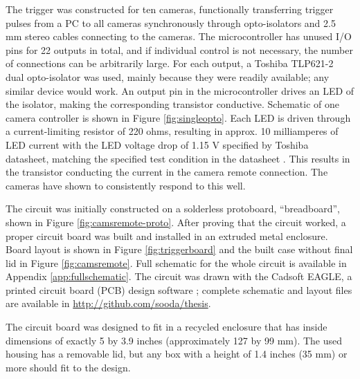 The trigger was constructed for ten cameras, functionally transferring trigger pulses from a PC to all cameras synchronously through opto-isolators and 2.5 mm stereo cables connecting to the cameras.
The microcontroller has unused I/O pins for 22 outputs in total, and if individual control is not necessary, the number of connections can be arbitrarily large.
For each output, a Toshiba TLP621-2 dual opto-isolator was used, mainly because they were readily available; any similar device would work.
An output pin in the microcontroller drives an LED of the isolator, making the corresponding transistor conductive.
Schematic of one camera controller is shown in Figure \ref{fig:singleopto}.
Each LED is driven through a current-limiting resistor of 220 ohms, resulting in approx. 10 milliamperes of LED current with the LED voltage drop of 1.15 V specified by Toshiba datasheet, matching the specified test condition in the datasheet \cite{tlp621}.
This results in the transistor conducting the current in the camera remote connection.
The cameras have shown to consistently respond to this well.

The circuit was initially constructed on a solderless protoboard, ``breadboard'', shown in Figure \ref{fig:camsremote-proto}.
After proving that the circuit worked, a proper circuit board was built and installed in an extruded metal enclosure.
Board layout is shown in Figure \ref{fig:triggerboard} and the built case without final lid in Figure \ref{fig:camsremote}.
Full schematic for the whole circuit is available in Appendix \ref{app:fullschematic}.
The circuit was drawn with the Cadsoft EAGLE, a printed circuit board (PCB) design software \cite{eaglepcb}; complete schematic and layout files are available in \url {http://github.com/sooda/thesis}.

The circuit board was designed to fit in a recycled enclosure that has inside dimensions of exactly 5 by 3.9 inches (approximately 127 by 99 mm).
The used housing has a removable lid, but any box with a height of 1.4 inches (35 mm) or more should fit to the design.


